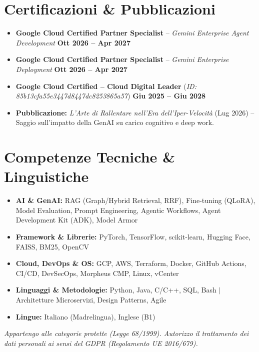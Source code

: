 \documentclass[a4paper,10pt]{article}
\begin{document}
\section{Certificazioni \& Pubblicazioni}
\begin{itemize}
    \item \textbf{Google Cloud Certified Partner Specialist} -- \textit{Gemini Enterprise Agent Development} \hfill \textbf{Ott 2026 -- Apr 2027}
    \item \textbf{Google Cloud Certified Partner Specialist} -- \textit{Gemini Enterprise Deployment} \hfill \textbf{Ott 2026 -- Apr 2027}
    \item \textbf{Google Cloud Certified -- Cloud Digital Leader} (\textit{ID: 85b13cfa55e3447d8447dc8253865a57}) \hfill \textbf{Giu 2025 -- Giu 2028}
    \item \textbf{Pubblicazione:} \textit{L'Arte di Rallentare nell'Era dell'Iper-Velocità} (Lug 2026) -- Saggio sull'impatto della GenAI su carico cognitivo e deep work.
\end{itemize}

\section{Competenze Tecniche \& Linguistiche}
\begin{itemize}
    \item \textbf{AI \& GenAI:} RAG (Graph/Hybrid Retrieval, RRF), Fine-tuning (QLoRA), Model Evaluation, Prompt Engineering, Agentic Workflows, Agent Development Kit (ADK), Model Armor
    \item \textbf{Framework \& Librerie:} PyTorch, TensorFlow, scikit-learn, Hugging Face, FAISS, BM25, OpenCV
    \item \textbf{Cloud, DevOps \& OS:} GCP, AWS, Terraform, Docker, GitHub Actions, CI/CD, DevSecOps, Morpheus CMP, Linux, vCenter
    \item \textbf{Linguaggi \& Metodologie:} Python, Java, C/C++, SQL, Bash $\mid$ Architetture Microservizi, Design Patterns, Agile
    \item \textbf{Lingue:} Italiano (Madrelingua), Inglese (B1)
\end{itemize}

\vfill
\begin{center}
    \scriptsize\textit{Appartengo alle categorie protette (Legge 68/1999). Autorizzo il trattamento dei dati personali ai sensi del GDPR (Regolamento UE 2016/679).}
\end{center}
\end{document}
